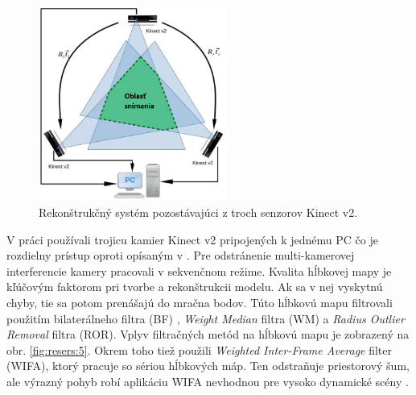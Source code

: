 \begin{figure}[h]
	\centering
	\includegraphics[width=0.55\textwidth]{figures/resers_m.png}
	\caption{Rekonštrukčný systém pozostávajúci z troch senzorov Kinect v2.}
	\label{fig:resers:m}
\end{figure}

V práci používali trojicu kamier Kinect v2 pripojených k jednému PC čo je rozdielny prístup oproti opísaným v \cite{7335499,6726991}. Pre odstránenie multi-kamerovej interferencie kamery pracovali v sekvenčnom režime. Kvalita hĺbkovej mapy je kľúčovým faktorom pri tvorbe a rekonštrukcii modelu. Ak sa v nej vyskytnú chyby, tie sa potom prenášajú do mračna bodov. Túto hĺbkovú mapu filtrovali použitím bilaterálneho filtra (BF) \cite{6272078}, \textit{Weight Median} filtra (WM) a \textit{Radius Outlier Removal} filtra (ROR). Vplyv filtračných metód na hĺbkovú mapu je zobrazený na obr. \ref{fig:resers:5}. Okrem toho tiež použili \textit{Weighted  Inter-Frame  Average} filter (WIFA), ktorý pracuje so sériou hĺbkových máp. Ten odstraňuje priestorový šum, ale výrazný pohyb robí aplikáciu WIFA nevhodnou pre vysoko dynamické scény \cite{6756961}.

